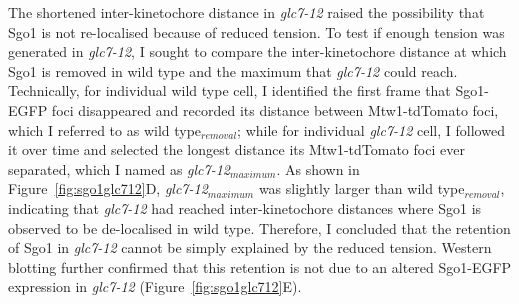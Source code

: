 The shortened inter-kinetochore distance in \textit{glc7-12} raised the possibility that Sgo1 is not re-localised because of reduced tension. To test if enough tension was generated in \textit{glc7-12}, I sought to compare the inter-kinetochore distance at which Sgo1 is removed in wild type and the maximum that \textit{glc7-12} could reach. Technically, for individual wild type cell, I identified the first frame that Sgo1-EGFP foci disappeared and recorded its distance between Mtw1-tdTomato foci, which I referred to as wild type$_{removal}$; while for individual \textit{glc7-12} cell, I followed it over time and selected the longest distance its Mtw1-tdTomato foci ever separated, which I named as \textit{glc7-12}$_{maximum}$. As shown in Figure~\ref{fig:sgo1glc712}D, \textit{glc7-12}$_{maximum}$ was slightly larger than wild type$_{removal}$, indicating that \textit{glc7-12} had reached inter-kinetochore distances where Sgo1 is observed to be de-localised in wild type. Therefore, I concluded that the retention of Sgo1 in \textit{glc7-12} cannot be simply explained by the reduced tension. Western blotting further confirmed that this retention is not due to an altered Sgo1-EGFP expression in \textit{glc7-12} (Figure~\ref{fig:sgo1glc712}E). 

